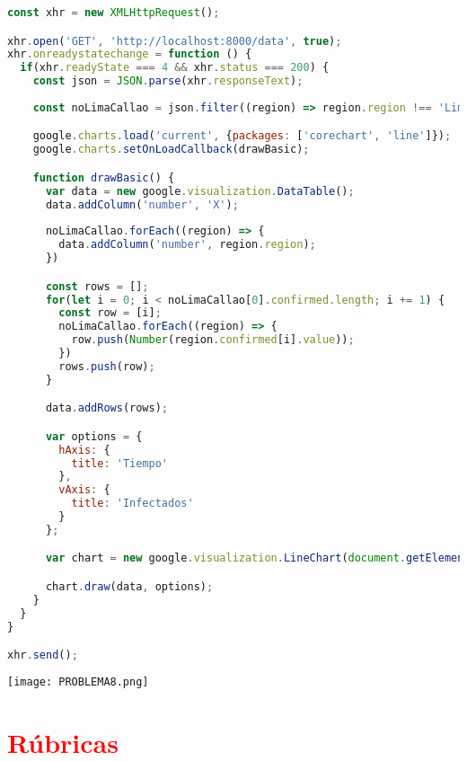 \documentclass{article}
\begin{document}
\begin{itemize}
\begin{lstlisting}[language=JavaScript, caption=PROBLEMA8-SCRIPT]
const xhr = new XMLHttpRequest(); 

xhr.open('GET', 'http://localhost:8000/data', true);
xhr.onreadystatechange = function () {
  if(xhr.readyState === 4 && xhr.status === 200) {
    const json = JSON.parse(xhr.responseText);
    
    const noLimaCallao = json.filter((region) => region.region !== 'Lima' && region.region !== 'Callao');

    google.charts.load('current', {packages: ['corechart', 'line']});
    google.charts.setOnLoadCallback(drawBasic);

    function drawBasic() {
      var data = new google.visualization.DataTable();
      data.addColumn('number', 'X');
 
      noLimaCallao.forEach((region) => {
        data.addColumn('number', region.region);
      })

      const rows = [];
      for(let i = 0; i < noLimaCallao[0].confirmed.length; i += 1) {
        const row = [i];
        noLimaCallao.forEach((region) => {
          row.push(Number(region.confirmed[i].value));
        })
        rows.push(row);
      }

      data.addRows(rows);

      var options = {
        hAxis: {
          title: 'Tiempo'
        },
        vAxis: {
          title: 'Infectados'
        }
      };

      var chart = new google.visualization.LineChart(document.getElementById('chart_div'));

      chart.draw(data, options);
    }
  }
}

xhr.send();
            \end{lstlisting}  

            \newline \newline \newline
            \texttt{[image: PROBLEMA8.png]}  
            
	\end{itemize}	
    \clearpage

	\section{\textcolor{red}{Rúbricas}}
	
\end{document}
